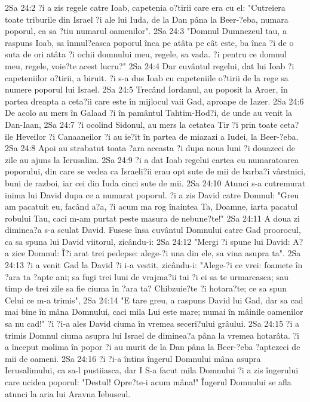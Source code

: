 2Sa 24:2  ?i a zis regele catre Ioab, capetenia o?tirii care era cu el: "Cutreiera toate triburile din Israel ?i ale lui Iuda, de la Dan pâna la Beer-?eba, numara poporul, ca sa ?tiu numarul oamenilor".
2Sa 24:3  "Domnul Dumnezeul tau, a raspuns Ioab, sa înmul?easca poporul înca pe atâta pe cât este, ba înca ?i de o suta de ori atâta ?i ochii domnului meu, regele, sa vada. ?i pentru ce domnul meu, regele, voie?te acest lucru?"
2Sa 24:4  Dar cuvântul regelui, dat lui Ioab ?i capeteniilor o?tirii, a biruit. ?i s-a dus Ioab cu capeteniile o?tirii de la rege sa numere poporul lui Israel.
2Sa 24:5  Trecând Iordanul, au poposit la Aroer, în partea dreapta a ceta?ii care este în mijlocul vaii Gad, aproape de Iazer.
2Sa 24:6  De acolo au mers în Galaad ?i în pamântul Tahtim-Hod?i, de unde au venit la Dan-Iaan,
2Sa 24:7  ?i ocolind Sidonul, au mers la cetatea Tir ?i prin toate ceta?ile Heveilor ?i Canaaneilor ?i au ie?it în partea de miazazi a Iudei, la Beer-?eba.
2Sa 24:8  Apoi au strabatut toata ?ara aceasta ?i dupa noua luni ?i douazeci de zile au ajuns la Ierusalim.
2Sa 24:9  ?i a dat Ioab regelui cartea cu numaratoarea poporului, din care se vedea ca Israeli?ii erau opt sute de mii de barba?i vârstnici, buni de razboi, iar cei din Iuda cinci sute de mii.
2Sa 24:10  Atunci s-a cutremurat inima lui David dupa ce a numarat poporul. ?i a zis David catre Domnul: "Greu am pacatuit eu, facând a?a, ?i acum ma rog înaintea Ta, Doamne, iarta pacatul robului Tau, caci m-am purtat peste masura de nebune?te!"
2Sa 24:11  A doua zi diminea?a s-a sculat David. Fusese însa cuvântul Domnului catre Gad proorocul, ca sa spuna lui David viitorul, zicându-i:
2Sa 24:12  "Mergi ?i spune lui David: A?a zice Domnul: Î?i arat trei pedepse: alege-?i una din ele, sa vina asupra ta".
2Sa 24:13  ?i a venit Gad la David ?i i-a vestit, zicându-i: "Alege-?i ce vrei: foamete în ?ara ta ?apte ani; sa fugi trei luni de vrajma?ii tai ?i ei sa te urmareasca; sau timp de trei zile sa fie ciuma în ?ara ta? Chibzuie?te ?i hotara?te; ce sa spun Celui ce m-a trimis",
2Sa 24:14  "E tare greu, a raspuns David lui Gad, dar sa cad mai bine în mâna Domnului, caci mila Lui este mare; numai în mâinile oamenilor sa nu cad!" ?i ?i-a ales David ciuma în vremea seceri?ului grâului.
2Sa 24:15  ?i a trimis Domnul ciuma asupra lui Israel de diminea?a pâna la vremea hotarâta. ?i a început molima în popor ?i au murit de la Dan pâna la Beer-?eba ?aptezeci de mii de oameni.
2Sa 24:16  ?i ?i-a întins îngerul Domnului mâna asupra Ierusalimului, ca sa-l pustiiasca, dar I S-a facut mila Domnului ?i a zis îngerului care ucidea poporul: "Destul! Opre?te-i acum mâna!" Îngerul Domnului se afla atunci la aria lui Aravna Iebuseul.
